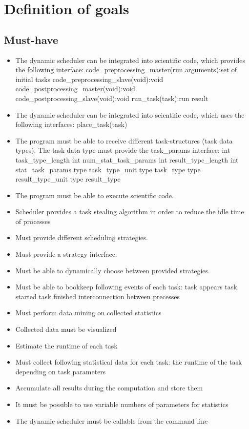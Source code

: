 \section{Definition of goals}
	\subsection{Must-have}
		\begin{itemize}
			\item The dynamic scheduler can be integrated into scientific code, which provides the following interface:
				\subitem code\_preprocessing\_master(run arguments):set of initial tasks
				\subitem code\_preprocessing\_slave(void):void
				\subitem code\_postprocessing\_master(void):void
				\subitem code\_postprocessing\_slave(void):void
				\subitem run\_task(task):run result
			\item The dynamic scheduler can be integrated into scientific code, which uses the following interfaces:
				\subitem place\_task(task)
			\item The program must be able to receive different task-structures (task data types). The task data type must provide the task\_params interface:
				\subitem int task\_type\_length
				\subitem int num\_stat\_task\_params
				\subitem int result\_type\_length
				\subitem int stat\_task\_params
				\subitem type task\_type\_unit
				\subitem type task\_type
				\subitem type result\_type\_unit
				\subitem type result\_type
				
			\item The program must be able to execute scientific code.%
			\item Scheduler provides a task stealing algorithm in order to reduce the idle time of processes%
			\item Must provide different scheduling strategies.
			\item Must provide a strategy interface.
			\item Must be able to dynamically choose between provided strategies.
			\item Must be able to bookkeep following events of each task:
				\subitem task appears
				\subitem task started
				\subitem task finished
				\subitem interconnection between precesses
			\item Must perform data mining on collected statistics
			\item Collected data must be visualized
			\item Estimate the runtime of each task
			\item Must collect following statistical data for each task:
				\subitem the runtime of the task depending on task parameters
			\item Accumulate all results during the computation and store them
			\item It must be possible to use variable numbers of parameters for statistics
			\item The dynamic scheduler must be callable from the command line
		\end{itemize}
